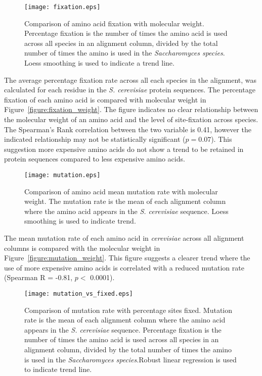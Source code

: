 \begin{figure}
  \centering
  \texttt{[image: fixation.eps]}
  \caption[Comparison of amino acid fixation with molecular weight]{Comparison of amino acid fixation with molecular weight. Percentage fixation is the number of times the amino acid is used across all species in an alignment column, divided by the total number of times the amino is used in the \emph{Saccharomyces species}. Loess smoothing is used to indicate a trend line.}
  \label{figure:fixation_weight}
\end{figure}

The average percentage fixation rate across all each species in the alignment, was calculated for each residue in the \emph{S. cerevisiae} protein sequences. The percentage fixation of each amino acid is compared with molecular weight in Figure~\vref{figure:fixation_weight}. The figure indicates no clear relationship between the molecular weight of an amino acid and the level of site-fixation across species. The Spearman's Rank correlation between the two variable is 0.41, however the indicated relationship may not be statistically significant ($p = 0.07$). This suggestion more expensive amino acids do not show a trend to be retained in protein sequences compared to less expensive amino acids.

\begin{figure}
  \centering
  \texttt{[image: mutation.eps]}
  \caption[Comparison of amino acid mean mutation rate with molecular weight]{Comparison of amino acid mean mutation rate with molecular weight. The mutation rate is the mean of each alignment column where the amino acid appears in the \emph{S. cerevisiae} sequence. Loess smoothing is used to indicate trend.}
  \label{figure:mutation_weight}
\end{figure}

The mean mutation rate of each amino acid in \emph{cerevisiae} across all alignment columns is compared with the molecular weight in Figure~\vref{figure:mutation_weight}. This figure suggests a clearer trend where the use of more expensive amino acids is correlated with a reduced mutation rate (Spearman R = -0.81, $p <$ 0.0001).

\begin{figure}
  \centering
  \texttt{[image: mutation\_vs\_fixed.eps]}
  \caption[Comparison of mutation rate with percentage sites fixed]{Comparison of mutation rate with percentage sites fixed. Mutation rate is the mean of each alignment column where the amino acid appears in the \emph{S. cerevisiae} sequence. Percentage fixation is the number of times the amino acid is used across all species in an alignment column, divided by the total number of times the amino is used in the \emph{Saccharomyces species}.Robust linear regression is used to indicate trend line.}
  \label{figure:mutation_vs_fixed}
\end{figure}

